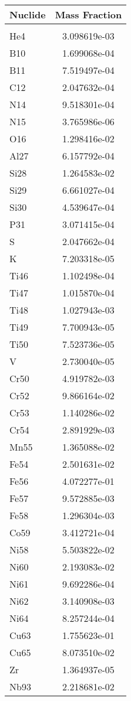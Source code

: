 \begin{centering}
\begin{table}[ht!]
\begin{tabular}{l | c}
\hline
Nuclide & Mass Fraction\\
\hline
\\
He4 & 3.098619e-03\\
B10 & 1.699068e-04\\
B11 & 7.519497e-04\\
C12 & 2.047632e-04\\
N14 & 9.518301e-04\\
N15 & 3.765986e-06\\
O16 & 1.298416e-02\\
Al27 & 6.157792e-04\\
Si28 & 1.264583e-02\\
Si29 & 6.661027e-04\\
Si30 & 4.539647e-04\\
P31 & 3.071415e-04\\
S & 2.047662e-04\\
K & 7.203318e-05\\
Ti46 & 1.102498e-04\\
Ti47 & 1.015870e-04\\
Ti48 & 1.027943e-03\\
Ti49 & 7.700943e-05\\
Ti50 & 7.523736e-05\\
V & 2.730040e-05\\
Cr50 & 4.919782e-03\\
Cr52 & 9.866164e-02\\
Cr53 & 1.140286e-02\\
Cr54 & 2.891929e-03\\
Mn55 & 1.365088e-02\\
Fe54 & 2.501631e-02\\
Fe56 & 4.072277e-01\\
Fe57 & 9.572885e-03\\
Fe58 & 1.296304e-03\\
Co59 & 3.412721e-04\\
Ni58 & 5.503822e-02\\
Ni60 & 2.193083e-02\\
Ni61 & 9.692286e-04\\
Ni62 & 3.140908e-03\\
Ni64 & 8.257244e-04\\
Cu63 & 1.755623e-01\\
Cu65 & 8.073510e-02\\
Zr & 1.364937e-05\\
Nb93 & 2.218681e-02\\

\end{tabular}
\end{table}
\end{centering}
